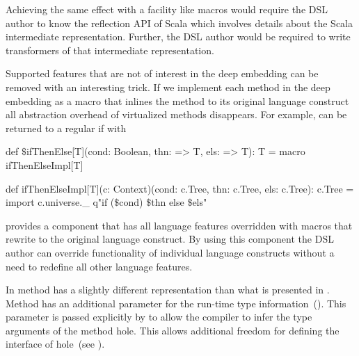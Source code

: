 Achieving the same effect with a facility like macros would require the DSL author to know the
reflection API of Scala which involves details about the Scala intermediate representation.
Further, the DSL author would be required to write transformers of that intermediate representation.

Supported features that are not of interest in the deep embedding
 can be removed with an interesting trick. If we implement each method in the deep embedding as a macro
 that inlines the method to its original language construct all abstraction overhead of virtualized methods
 disappears. For example,  can be returned to a regular if with\begin{lstparagraph}
def $\$$ifThenElse[T](cond: Boolean, thn: => T, els: => T): T =
  macro ifThenElseImpl[T]

def ifThenElseImpl[T](c: Context)(cond: c.Tree,
  thn: c.Tree, els: c.Tree): c.Tree = { import c.universe._
  q"if ($\$$cond) $\$$thn else $\$$els"
}
\end{lstparagraph}

\yy provides a component that has all language features overridden with macros that rewrite
to the original language construct. By using this component the DSL author can override functionality
of individual language constructs without a need to redefine all other language features.


In  method  has a slightly different  representation than what is presented in . Method 
 has an additional parameter for the run-time type information~().
 This parameter is passed explicitly by \yy to allow the compiler to infer the type arguments
 of the method hole. This allows additional freedom for defining the interface of hole~(see ).


